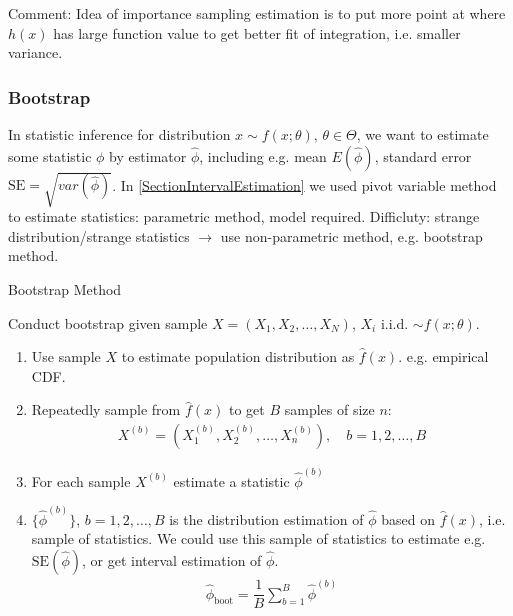         
    Comment: Idea of importance sampling estimation is to put more point at where $ h(x) $ has large function value to get better fit of integration, i.e. smaller variance.
    
\subsubsection{Bootstrap}
    In statistic inference for distribution $ x\sim f(x;\theta ) ,\,\theta \in \Theta $, we want to estimate some statistic $ \phi $ by estimator $ \hat{\phi } $, including e.g. mean $ E(\hat{\phi}) $, standard error $ \mathrm{SE}=\sqrt{var(\hat{\phi })}  $. In \autoref{SectionIntervalEstimation} we used pivot variable method to estimate statistics: parametric method, model required. Difficluty: strange distribution/strange statistics $ \to $ use non-parametric method, e.g. bootstrap method.
    
\begin{point}
    Bootstrap Method
\end{point}

    Conduct bootstrap given sample $ X=(X_{1},X_{2},\ldots,X_{N})  $, $ X_i $ i.i.d. $ \sim f(x;\theta ) $.

\begin{enumerate}[topsep=2pt,itemsep=0pt]
    \item Use sample $ X $ to estimate population distribution as $ \hat{f}(x) $. e.g. empirical CDF.
    \item Repeatedly sample from $ \hat{f}(x) $ to get $ B $ samples of size $ n $:
    \begin{align}
        X^{(b)}=(X^{(b)}_{1},X^{(b)}_{2},\ldots,X^{(b)}_{n})  ,\quad b=1,2,\ldots,B
    \end{align}
    \item For each sample $ X^{(b)} $ estimate a statistic $ \hat{\phi }^{(b)} $
    \item $\{ \hat{\phi }^{(b)} \}$, $ b=1,2,\ldots,B $ is the distribution estimation of $ \hat{\phi} $ based on $ \hat{f}(x) $, i.e. sample of statistics. We could use this sample of statistics to estimate e.g. $ \mathrm{SE}(\hat{\phi})  $, or get interval estimation of $ \hat{\phi } $.
    \begin{align}
        \hat{\phi }_\mathrm{boot} =\dfrac{1}{B}\sum_{b=1}^B\hat{\phi}^{(b)} 
    \end{align}
    
    
\end{enumerate}

